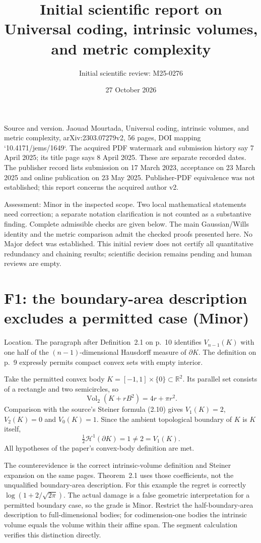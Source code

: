 \documentclass[10pt]{article}
\title{Initial scientific report on
Universal coding, intrinsic volumes, and metric complexity}
\author{Initial scientific review: M25-0276}
\date{27 October 2026}
\begin{document}
\maketitle
Source and version. Jaouad Mourtada, Universal coding, intrinsic volumes, and metric complexity, arXiv:2303.07279v2, 56 pages, DOI mapping `10.4171/jems/1649`. The acquired PDF watermark and submission history say 7 April 2025; its title page says 8 April 2025. These are separate recorded dates. The publisher record lists submission on 17 March 2023, acceptance on 23 March 2025 and online publication on 23 May 2025. Publisher-PDF equivalence was not established; this report concerns the acquired author v2.\par
Assessment: Minor in the inspected scope. Two local mathematical statements need correction; a separate notation clarification is not counted as a substantive finding. Complete admissible checks are given below. The main Gaussian/Wills identity and the metric comparison admit the checked proofs presented here. No Major defect was established. This initial review does not certify all quantitative redundancy and chaining results; scientific decision remains pending and human reviews are empty.\par
\section*{F1: the boundary-area description excludes a permitted case (Minor)}
Location. The paragraph after Definition 2.1 on p. 10 identifies \(V_{n-1}(K)\) with one half of the \((n-1)\)-dimensional Hausdorff measure of \(\partial K\). The definition on p. 9 expressly permits compact convex sets with empty interior.\par
Take the permitted convex body \(K=[-1,1]\times\{0\}\subset\mathbb R^2\). Its parallel set consists of a rectangle and two semicircles, so \[\operatorname{Vol}_2(K+rB^2)=4r+\pi r^2.\] Comparison with the source’s Steiner formula (2.10) gives \(V_1(K)=2\), \(V_2(K)=0\) and \(V_0(K)=1\). Since the ambient topological boundary of \(K\) is \(K\) itself, \[\tfrac12\mathcal H^1(\partial K)=1\ne2=V_1(K).\] All hypotheses of the paper’s convex-body definition are met.\par
The counterevidence is the correct intrinsic-volume definition and Steiner expansion on the same pages. Theorem 2.1 uses those coefficients, not the unqualified boundary-area description. For this example the regret is correctly \(\log(1+2/\sqrt{2\pi})\). The actual damage is a false geometric interpretation for a permitted boundary case, so the grade is Minor. Restrict the half-boundary-area description to full-dimensional bodies; for codimension-one bodies the intrinsic volume equals the volume within their affine span. The segment calculation verifies this distinction directly.\par
\end{document}
